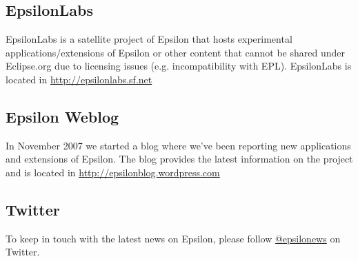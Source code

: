\subsection{EpsilonLabs}

EpsilonLabs is a satellite project of Epsilon that hosts experimental applications/extensions of Epsilon or other content that cannot be shared under Eclipse.org due to licensing issues (e.g. incompatibility with EPL). EpsilonLabs is located in \url{http://epsilonlabs.sf.net}

\subsection{Epsilon Weblog}
In November 2007 we started a blog where we've been reporting new applications and extensions of Epsilon. The blog provides the latest information on the project and is located in \url{http://epsilonblog.wordpress.com}

\subsection{Twitter}
To keep in touch with the latest news on Epsilon, please follow \href{http://twitter.com/#!/epsilonews}{@epsilonews} on Twitter.